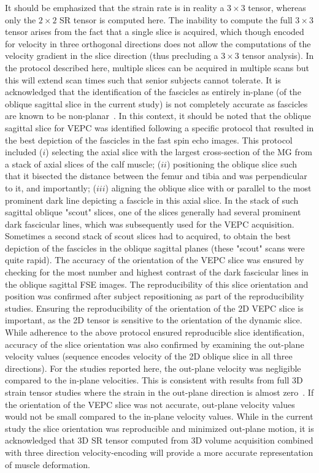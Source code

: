 It should be emphasized that the strain rate is in reality a $3 \times 3$ tensor, whereas only the $2 \times 2$ SR tensor is computed here.
The inability to compute the full $3 \times 3$ tensor arises from the fact that a single slice is acquired, which though encoded for velocity in three orthogonal directions does not allow the computations of the velocity gradient in the slice direction (thus precluding a $3 \times 3$ tensor analysis).  
In the protocol described here, multiple slices can be acquired in multiple scans but this will extend scan times such that senior subjects cannot tolerate. 
It is acknowledged that the identification of the fascicles as entirely in-plane (of the oblique sagittal slice in the current study) is not completely accurate as fascicles are known to be non-planar~\cite{RNSS20}.
In this context, it should be noted that the oblique sagittal slice for VEPC was identified following a specific protocol that resulted in the best depiction of the fascicles in the fast spin echo images. 
This protocol included ($i$) selecting the axial slice with the largest cross-section of the MG from a stack of axial slices of the calf muscle; ($ii$) positioning the oblique slice such that it bisected the distance between the femur and tibia and was perpendicular to it, and importantly; ($iii$) aligning the oblique slice with or parallel to the most prominent dark line depicting a fascicle in this axial slice. 
In the stack of such sagittal oblique "scout" slices, one of the slices generally had several prominent dark fascicular lines, which was subsequently used for the VEPC acquisition. 
Sometimes a second stack of scout slices had to acquired, to obtain the best depiction of the fascicles in the oblique sagittal planes (these "scout" scans were quite rapid). 
The accuracy of the orientation of the VEPC slice was ensured by checking for the most number and highest contrast of the dark fascicular lines in the oblique sagittal FSE images. 
The reproducibility of this slice orientation and position was confirmed after subject repositioning as part of the reproducibility studies. 
Ensuring the reproducibility of the orientation of the 2D VEPC slice is important, as the 2D tensor is sensitive to the orientation of the dynamic slice. 
While adherence to the above protocol ensured reproducible slice identification, accuracy of the slice orientation was also confirmed by examining the out-plane velocity values (sequence encodes velocity of the 2D oblique slice in all three directions). 
For the studies reported here, the out-plane velocity was negligible compared to the in-plane velocities. 
This is consistent with results from full 3D strain tensor studies where the strain in the out-plane direction is almost zero~\cite{RNS31}. 
If the orientation of the VEPC slice was not accurate, out-plane velocity values would not be small compared to the in-plane velocity values. 
While in the current study the slice orientation was reproducible and minimized out-plane motion, it is acknowledged that 3D SR tensor computed from 3D volume acquisition combined with three direction velocity-encoding will provide a more accurate representation of muscle deformation.
